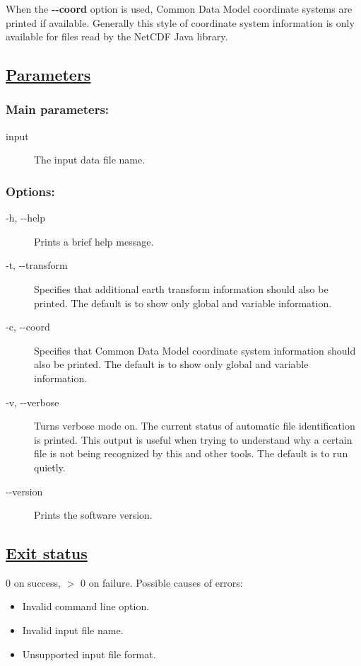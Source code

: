  When the \textbf{-{-}coord}
 option is used, Common Data Model coordinate systems are printed if available. Generally this style of coordinate system information is only available for files read by the NetCDF Java library.
\subsection*{\underline{Parameters}}
\subsubsection*{Main parameters:}
\begin{description}
\item[input]The input data file name. 

\end{description}
\subsubsection*{Options:}
\begin{description}
\item[ -h, -{-}help ] Prints a brief help message. 
\item[ -t, -{-}transform ] Specifies that additional earth transform information should also be printed. The default is to show only global and variable information. 
\item[ -c, -{-}coord ] Specifies that Common Data Model coordinate system information should also be printed. The default is to show only global and variable information. 
\item[ -v, -{-}verbose ] Turns verbose mode on. The current status of automatic file identification is printed. This output is useful when trying to understand why a certain file is not being recognized by this and other tools. The default is to run quietly. 
\item[-{-}version]Prints the software version.

\end{description}
\subsection*{\underline{Exit status}}


  0 on success, $>$ 0 on failure. Possible causes of errors: \begin{itemize}
\item  Invalid command line option. 
\item  Invalid input file name. 
\item  Unsupported input file format. 

\end{itemize}

